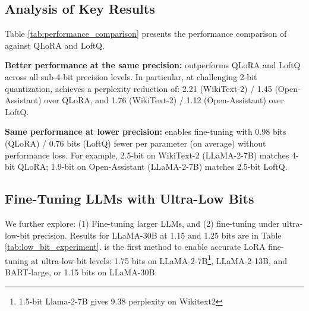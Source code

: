 \subsection{Analysis of Key Results}
\label{subsec:key_results}
Table \ref{tab:performance_comparison} presents the performance comparison of \FWName against QLoRA and LoftQ.
\begin{packeditemize}
    \item \textbf{Better performance at the same precision:} \FWName outperforms QLoRA and LoftQ across all sub-4-bit precision levels.
    In particular, at challenging 2-bit quantization, %
    \FWName achieves a perplexity reduction of: 2.21 (WikiText-2) / 1.45 (Open-Assistant) over QLoRA, and 1.76 (WikiText-2) / 1.12 (Open-Assistant) over LoftQ.
    \item \textbf{Same performance at lower precision:} %
    \FWName enables fine-tuning with 0.98 bits (QLoRA) / 0.76 bits (LoftQ) fewer per parameter (on average) without performance loss.
    For example, 2.5-bit \FWName on WikiText-2 (LLaMA-2-7B) matches 4-bit QLoRA; 1.9-bit \FWName on Open-Assistant (LLaMA-2-7B) matches 2.5-bit LoftQ. 
\end{packeditemize}

\subsection{Fine-Tuning LLMs with Ultra-Low Bits}
\label{subsec:ultra-low-bit}
We further explore: (1) Fine-tuning larger LLMs, and (2) fine-tuning under ultra-low-bit precision.
Results for LLaMA-30B at 1.15 and 1.25 bits are in Table \ref{tab:low_bit_experiment}.
\FWName is the first method to enable accurate LoRA fine-tuning at ultra-low-bit levels: 1.75 bits on LLaMA-2-7B\footnote{1.5-bit Llama-2-7B gives 9.38 perplexity on Wikitext2}, LLaMA-2-13B, and BART-large, or 1.15 bits on LLaMA-30B.

